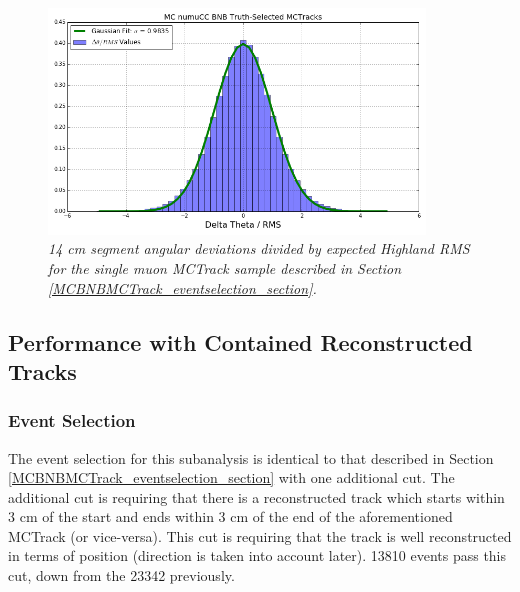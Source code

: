 \begin{figure}[ht!]
\begin{center}
\includegraphics[width=100mm]{Figures/Highland_validation_MCBNBMCTrack.png}
\end{center}
\caption{\textit{14 cm segment angular deviations divided by expected Highland RMS for the single muon {\sc MCTrack} sample described in Section \ref{MCBNBMCTrack_eventselection_section}.}}
\label{Highland_validation_MCTracks_fig}
\end{figure}




























\subsection{Performance with Contained Reconstructed Tracks}\label{MCBNBRecoTrack_performance_section}

\subsubsection{Event Selection}\label{MCBNBRecoTrack_eventselection_section}
The event selection for this subanalysis is identical to that described in Section \ref{MCBNBMCTrack_eventselection_section} with one additional cut. The additional cut is requiring that there is a reconstructed track which starts within 3 cm of the start and ends within 3 cm of the end of the aforementioned {\sc MCTrack} (or vice-versa). This cut is requiring that the track is well reconstructed in terms of position (direction is taken into account later). 13810 events pass this cut, down from the 23342 previously.

